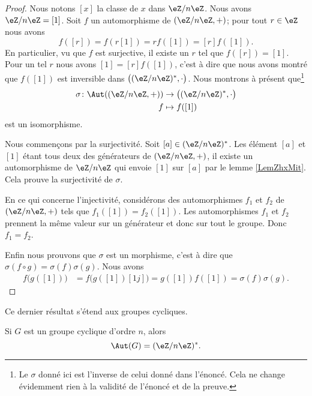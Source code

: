 \begin{proof}
    Nous notons \( [x]\) la classe de \( x\) dans \( \eZ/n\eZ\). Nous avons \( \eZ/n\eZ=[1]\). Soit \( f\) un automorphisme de \( (\eZ/n\eZ,+)\); pour tout \( r\in \eZ\) nous avons
    \begin{equation}
        f([r])=f(r[1])=rf([1])=[r]f([1]).
    \end{equation}
En particulier, vu que \( f\) est surjective, il existe un \( r\) tel que \( f([r])=[1]\). Pour un tel \( r\) nous avons \( [1]=[r]f([1])\), c'est à dire que nous avons montré que \( f([1])\) est inversible dans \(  \big( (\eZ/n\eZ)^*,\cdot\big)\). Nous montrons à présent que\footnote{Le \( \sigma\) donné ici est l'inverse de celui donné dans l'énoncé. Cela ne change évidemment rien à la validité de l'énoncé et de la preuve.}
    \begin{equation}
        \begin{aligned}
            \sigma\colon \Aut( (\eZ/n\eZ,+))&\to \big( (\eZ/n\eZ)^*,\cdot \big)\\
            f&\mapsto f([1]) 
        \end{aligned}
    \end{equation}
    est un isomorphisme.

    Nous commençons par la surjectivité. Soit \( [a]\in (\eZ/n\eZ)^*\). Les élément \( [a]\) et \( [1]\) étant tous deux des générateurs de \( (\eZ/n\eZ,+)\), il existe un automorphisme de \( \eZ/n\eZ\) qui envoie \( [1]\) sur \( [a]\) par le lemme \ref{LemZhxMit}. Cela prouve la surjectivité de \( \sigma\).

    En ce qui concerne l'injectivité, considérons des automorphismes \( f_1\) et \( f_2\) de \( (\eZ/n\eZ,+)\) tels que \( f_1([1])=f_2([1])\). Les automorphismes \( f_1\) et \( f_2\) prennent la même valeur sur un générateur et donc sur tout le groupe. Donc \( f_1=f_2\).

    Enfin nous prouvons que \( \sigma\) est un morphisme, c'est à dire que \( \sigma(f\circ g)=\sigma(f)\sigma(g)\). Nous avons
    \begin{subequations}
        \begin{align}
            f\big( g([1]) \big)&=f\big( g([1])[1j] \big)=g([1])f([1])=\sigma(f)\sigma(g).
        \end{align}
    \end{subequations}
\end{proof}

Ce dernier résultat s'étend aux groupes cycliques.
\begin{proposition}
    Si \( G\) est un groupe cyclique d'ordre \( n\), alors
    \begin{equation}
        \Aut(G)=(\eZ/n\eZ)^*.
    \end{equation}
\end{proposition}

